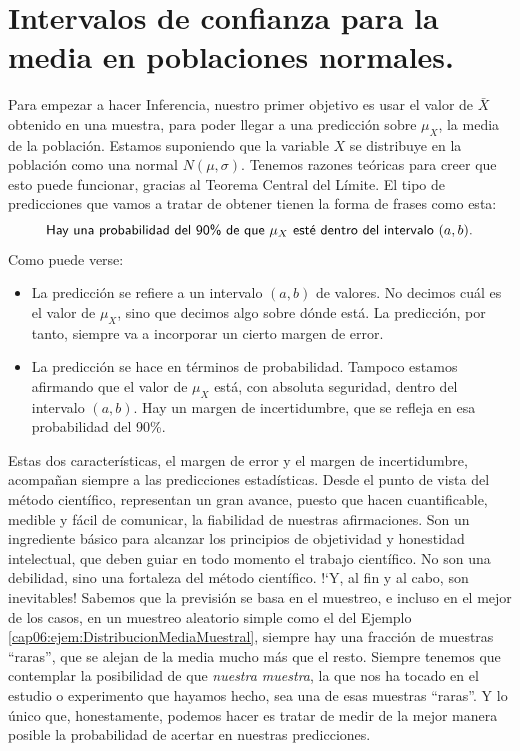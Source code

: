 \section{Intervalos de confianza para la media en poblaciones normales.}
\label{cap06:sec:IntervaloConfianzaMediaPoblacionNormal}

Para empezar a hacer Inferencia, nuestro primer objetivo es usar el valor de
$\bar X$ obtenido en una muestra, para  poder llegar a una predicción sobre
$\mu_X$, la media de la población. Estamos suponiendo que la variable $X$ se distribuye en la población como una normal $N(\mu, \sigma)$. Tenemos razones teóricas para creer que esto puede funcionar, gracias al Teorema Central del Límite. El tipo de predicciones que vamos a tratar de obtener tienen la forma de frases como esta:
   \begin{equation}\label{cap06:ecu:IntervaloConfianzaVersionInformal}
   \mbox{\sf Hay una probabilidad del 90\% de que $\mu_X$ esté dentro del intervalo $(a,b)$.}
   \end{equation}
Como puede verse:
\begin{itemize}
  \item La predicción se refiere a un intervalo $(a,b)$ de valores. No
      decimos {\sf cuál es} el valor de $\mu_X$, sino que decimos algo sobre
      {\sf dónde está}. La predicción, por tanto, siempre va a incorporar un
      cierto margen de error.
  \item La predicción se hace en términos de probabilidad. Tampoco estamos
      afirmando que el valor de $\mu_X$ está, con absoluta seguridad, dentro
      del intervalo $(a,b)$. Hay un margen de incertidumbre, que se
      refleja en esa probabilidad del 90\%.
\end{itemize}
Estas dos características, el margen de error y el margen de incertidumbre,
acompañan siempre a las predicciones estadísticas. Desde el punto de vista del
método científico, representan un gran avance, puesto que hacen cuantificable,
medible y fácil de comunicar, la fiabilidad de nuestras afirmaciones. Son un
ingrediente básico para alcanzar los principios de objetividad y honestidad
intelectual, que deben guiar en todo momento el trabajo científico. No son una
debilidad, sino una fortaleza del método científico. {!`}Y, al fin y al cabo, son
inevitables! Sabemos que la previsión se basa en el muestreo, e incluso en el
mejor de los casos, en un muestreo aleatorio simple como el del Ejemplo
\ref{cap06:ejem:DistribucionMediaMuestral}, siempre hay una fracción de
muestras ``raras'', que se alejan de la media mucho más que el resto. Siempre
tenemos que contemplar la posibilidad de que {\em nuestra muestra}, la que nos
ha tocado en el estudio o experimento que hayamos hecho, sea una de esas
muestras ``raras''. Y lo único que, honestamente, podemos hacer es tratar de
medir de la mejor manera posible la probabilidad de acertar en nuestras
predicciones.

